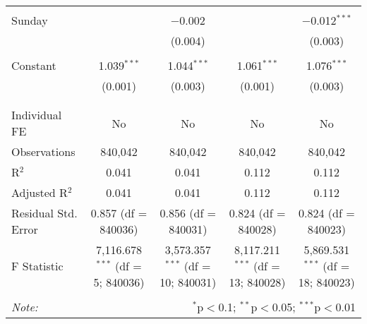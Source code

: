 \documentclass[
]{article}
\begin{document}
\begin{table}[!htbp]
{\begin{tabular}{@{\extracolsep{5pt}}lcccc}
  & & & & \\ 
 Sunday &  & $-$0.002 &  & $-$0.012$^{***}$ \\ 
  &  & (0.004) &  & (0.003) \\ 
  & & & & \\ 
 Constant & 1.039$^{***}$ & 1.044$^{***}$ & 1.061$^{***}$ & 1.076$^{***}$ \\ 
  & (0.001) & (0.003) & (0.001) & (0.003) \\ 
  & & & & \\ 
\hline \\[-1.8ex] 
Individual FE & No & No & No & No \\ 
Observations & 840,042 & 840,042 & 840,042 & 840,042 \\ 
R$^{2}$ & 0.041 & 0.041 & 0.112 & 0.112 \\ 
Adjusted R$^{2}$ & 0.041 & 0.041 & 0.112 & 0.112 \\ 
Residual Std. Error & 0.857 (df = 840036) & 0.856 (df = 840031) & 0.824 (df = 840028) & 0.824 (df = 840023) \\ 
F Statistic & 7,116.678$^{***}$ (df = 5; 840036) & 3,573.357$^{***}$ (df = 10; 840031) & 8,117.211$^{***}$ (df = 13; 840028) & 5,869.531$^{***}$ (df = 18; 840023) \\ 
\hline 
\hline \\[-1.8ex] 
\textit{Note:}  & \multicolumn{4}{r}{$^{*}$p$<$0.1; $^{**}$p$<$0.05; $^{***}$p$<$0.01} \\ 
\end{tabular}
} 
\end{table} 
\newpage
\end{document}
